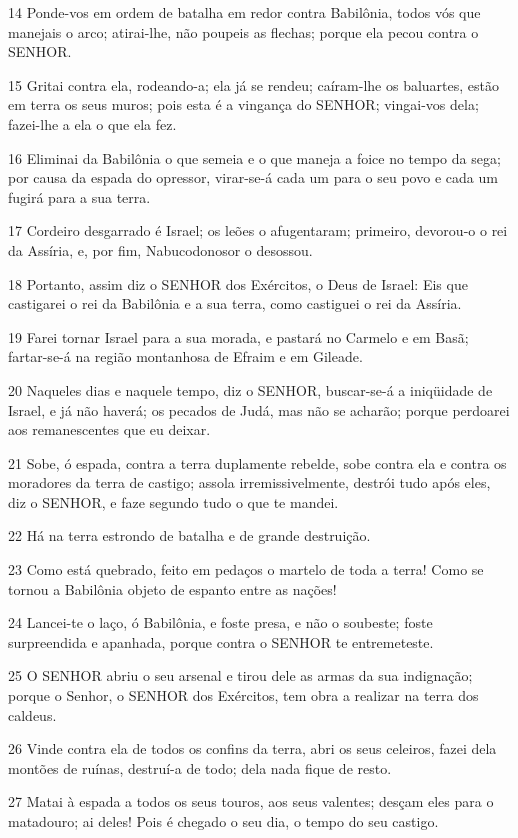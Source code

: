 \par 14 Ponde-vos em ordem de batalha em redor contra Babilônia, todos vós que manejais o arco; atirai-lhe, não poupeis as flechas; porque ela pecou contra o SENHOR.
\par 15 Gritai contra ela, rodeando-a; ela já se rendeu; caíram-lhe os baluartes, estão em terra os seus muros; pois esta é a vingança do SENHOR; vingai-vos dela; fazei-lhe a ela o que ela fez.
\par 16 Eliminai da Babilônia o que semeia e o que maneja a foice no tempo da sega; por causa da espada do opressor, virar-se-á cada um para o seu povo e cada um fugirá para a sua terra.
\par 17 Cordeiro desgarrado é Israel; os leões o afugentaram; primeiro, devorou-o o rei da Assíria, e, por fim, Nabucodonosor o desossou.
\par 18 Portanto, assim diz o SENHOR dos Exércitos, o Deus de Israel: Eis que castigarei o rei da Babilônia e a sua terra, como castiguei o rei da Assíria.
\par 19 Farei tornar Israel para a sua morada, e pastará no Carmelo e em Basã; fartar-se-á na região montanhosa de Efraim e em Gileade.
\par 20 Naqueles dias e naquele tempo, diz o SENHOR, buscar-se-á a iniqüidade de Israel, e já não haverá; os pecados de Judá, mas não se acharão; porque perdoarei aos remanescentes que eu deixar.
\par 21 Sobe, ó espada, contra a terra duplamente rebelde, sobe contra ela e contra os moradores da terra de castigo; assola irremissivelmente, destrói tudo após eles, diz o SENHOR, e faze segundo tudo o que te mandei.
\par 22 Há na terra estrondo de batalha e de grande destruição.
\par 23 Como está quebrado, feito em pedaços o martelo de toda a terra! Como se tornou a Babilônia objeto de espanto entre as nações!
\par 24 Lancei-te o laço, ó Babilônia, e foste presa, e não o soubeste; foste surpreendida e apanhada, porque contra o SENHOR te entremeteste.
\par 25 O SENHOR abriu o seu arsenal e tirou dele as armas da sua indignação; porque o Senhor, o SENHOR dos Exércitos, tem obra a realizar na terra dos caldeus.
\par 26 Vinde contra ela de todos os confins da terra, abri os seus celeiros, fazei dela montões de ruínas, destruí-a de todo; dela nada fique de resto.
\par 27 Matai à espada a todos os seus touros, aos seus valentes; desçam eles para o matadouro; ai deles! Pois é chegado o seu dia, o tempo do seu castigo.
